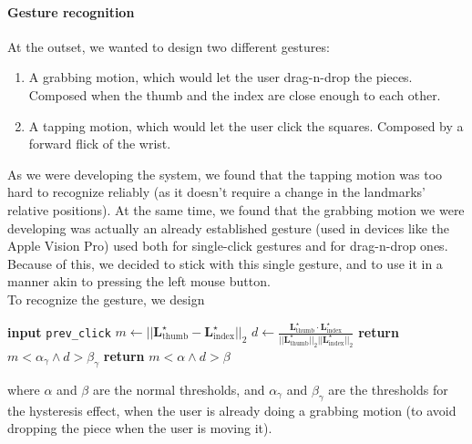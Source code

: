 \documentclass[a4paper, 11pt, twocolumn]{IEEEtran}
\begin{document}
    \paragraph*{Gesture recognition} At the outset, we wanted to design two different gestures:
    \begin{enumerate}
        \item A grabbing motion, which would let the user drag-n-drop the pieces. Composed when the thumb and the index are close enough to each other.
        \item A tapping motion, which would let the user click the squares. Composed by a forward flick of the wrist.
    \end{enumerate}
    As we were developing the system, we found that the tapping motion was too hard to recognize reliably (as it doesn't require a change in the landmarks' relative positions). At the same time, we found that the grabbing motion we were developing was actually an already established gesture (used in devices like the Apple Vision Pro) used both for single-click gestures and for drag-n-drop ones. Because of this, we decided to stick with this single gesture, and to use it in a manner akin to pressing the left mouse button.\\
    To recognize the gesture, we design
    \begin{algorithmic}[1]
        \State \textbf{input} \texttt{prev\_click}
        \State $m \gets ||\mathbf{L}^\star_{\mathrm{thumb}} - \mathbf{L}^\star_{\mathrm{index}}||_2$
        \State $d \gets \frac{\mathbf{L}^\star_{\mathrm{thumb}}\cdot\mathbf{L}^\star_{\mathrm{index}}}{||\mathbf{L}^\star_{\mathrm{thumb}}||_2 ||\mathbf{L}^\star_{\mathrm{index}}||_2}$
            \State \textbf{return} $m < \alpha_\gamma \land d > \beta_\gamma$
        \Else
            \State \textbf{return} $m < \alpha \land d > \beta$
        \EndIf
    \end{algorithmic}
    where $\alpha$ and $\beta$ are the normal thresholds, and $\alpha_\gamma$ and $\beta_\gamma$ are the thresholds for the hysteresis effect, when the user is already doing a grabbing motion (to avoid dropping the piece when the user is moving it).
\end{document}
